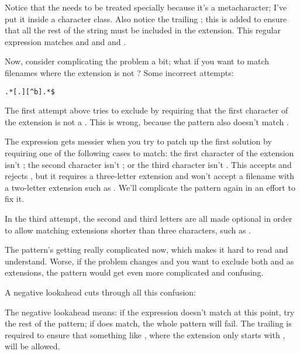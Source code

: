 \documentclass{howto}
\begin{document}

Notice that the  needs to be treated specially because it's a
metacharacter; I've put it inside a character class.  Also notice the
trailing \regexp{\$}; this is added to ensure that all the rest of the
string must be included in the extension.  This regular expression
matches  and  and  and
.

Now, consider complicating the problem a bit; what if you want to
match filenames where the extension is not ?
Some incorrect attempts:

\verb|.*[.][^b].*$|

The first attempt above tries to exclude  by requiring that
the first character of the extension is not a .  This is
wrong, because the pattern also doesn't match .


The expression gets messier when you try to patch up the first
solution by requiring one of the following cases to match: the first
character of the extension isn't ; the second character isn't
; or the third character isn't .  This accepts
 and rejects , but it requires a
three-letter extension and won't accept a filename with a two-letter
extension such as .  We'll complicate the pattern
again in an effort to fix it.


In the third attempt, the second and third letters are all made
optional in order to allow matching extensions shorter than three
characters, such as .

The pattern's getting really complicated now, which makes it hard to
read and understand.  Worse, if the problem changes and you want to
exclude both  and  as extensions, the pattern
would get even more complicated and confusing.

A negative lookahead cuts through all this confusion:


The negative lookahead means: if the expression  doesn't match at
this point, try the rest of the pattern; if  does match,
the whole pattern will fail.  The trailing \regexp{\$} is required to
ensure that something like , where the extension
only starts with , will be allowed.
\end{document}
